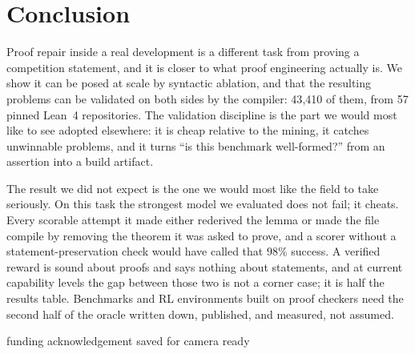 \documentclass{article}
\begin{document}
\section{Conclusion}

Proof repair inside a real development is a different task from proving a competition statement,
and it is closer to what proof engineering actually is. We show it can be posed at scale by
syntactic ablation, and that the resulting problems can be validated on both sides by the
compiler: 43{,}410 of them, from 57 pinned Lean~4 repositories. The validation discipline is
the part we would most like to see adopted elsewhere: it is cheap relative to the mining, it
catches unwinnable problems, and it turns
“is this benchmark well-formed?” from an assertion into a build artifact.

The result we did not expect is the one we would most like the field to take seriously. On this
task the strongest model we evaluated does not fail; it cheats. Every scorable attempt it made
either rederived the lemma or made the file compile by removing the theorem it was asked to
prove, and a scorer without a statement-preservation check would have called that 98\% success.
A verified reward is sound about proofs and says nothing about statements, and at current
capability levels the gap between those two is not a corner case; it is half the results
table. Benchmarks and RL environments built on proof checkers need the second half of the oracle
written down, published, and measured, not assumed.

\begin{ack}
funding acknowledgement saved for camera ready
\end{ack}
\end{document}
